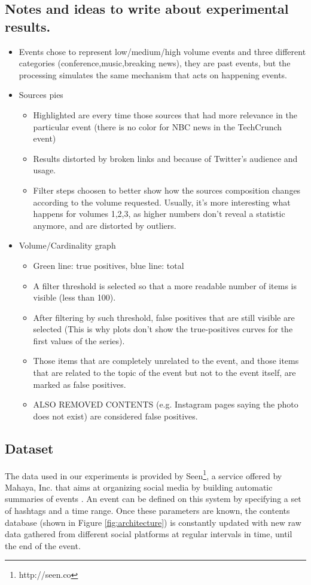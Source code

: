 \documentclass{sig-alternate}
\begin{document}
\subsection{Notes and ideas to write about experimental results.}
\begin{itemize}
\item Events chose to represent low/medium/high volume events and three different categories (conference,music,breaking news), they are past events, but the processing simulates the same mechanism that acts on happening events.
\item Sources pies
  \begin{itemize}
    \item Highlighted are every time those sources that had more relevance in the particular event (there is no color for NBC news in the TechCrunch event)
    \item Results distorted by broken links and because of Twitter's audience and usage.
    \item Filter steps choosen to better show how the sources composition changes according to the volume requested. Usually, it's more interesting what happens for volumes 1,2,3, as higher numbers don't reveal a statistic anymore, and are distorted by outliers.
  \end{itemize}
\item Volume/Cardinality graph
\begin{itemize}
    \item Green line: true positives, blue line: total
    \item A filter threshold is selected so that a more readable number of items is visible (less than 100).
    \item After filtering by such threshold, false positives that are still visible are selected (This is why plots don't show the true-positives curves for the first values of the series).
    \item Those items that are completely unrelated to the event, and those items that are related to the topic of the event but not to the event itself, are marked as false positives.
    \item ALSO REMOVED CONTENTS (e.g. Instagram pages saying the photo does not exist) are considered false positives.
\end{itemize}
\end{itemize}

\subsection{Dataset}
\label{sec:dataset}
The data used in our experiments is provided by Seen\footnote{http://seen.co}, a service offered by Mahaya, Inc. that aims at organizing social media by building automatic summaries of events \cite{SeenWired}. An event can be defined on this system by specifying a set of hashtags and a time range. Once these parameters are known, the contents database (shown in Figure \ref{fig:architecture}) is constantly updated with new raw data gathered from different social platforms at regular intervals in time, until the end of the event.
\end{document}
